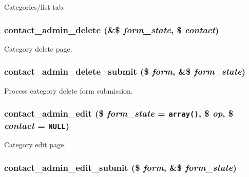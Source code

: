 Categories/list tab. \hypertarget{contact_8admin_8inc_c78c28a9e0308300c1e89223ea6984d9}{
\subsubsection[{contact\_\-admin\_\-delete}]{\setlength{\rightskip}{0pt plus 5cm}contact\_\-admin\_\-delete (\&\$ {\em form\_\-state}, \/  \$ {\em contact})}}
\label{contact_8admin_8inc_c78c28a9e0308300c1e89223ea6984d9}


Category delete page. \hypertarget{contact_8admin_8inc_9fb0a8959ab954f593d7d08ff3c748e9}{
\subsubsection[{contact\_\-admin\_\-delete\_\-submit}]{\setlength{\rightskip}{0pt plus 5cm}contact\_\-admin\_\-delete\_\-submit (\$ {\em form}, \/  \&\$ {\em form\_\-state})}}
\label{contact_8admin_8inc_9fb0a8959ab954f593d7d08ff3c748e9}


Process category delete form submission. \hypertarget{contact_8admin_8inc_5ca6a5a6a6782c03fa2c8355595e5325}{
\subsubsection[{contact\_\-admin\_\-edit}]{\setlength{\rightskip}{0pt plus 5cm}contact\_\-admin\_\-edit (\$ {\em form\_\-state} = {\tt array()}, \/  \$ {\em op}, \/  \$ {\em contact} = {\tt NULL})}}
\label{contact_8admin_8inc_5ca6a5a6a6782c03fa2c8355595e5325}


Category edit page. \hypertarget{contact_8admin_8inc_8eef340a2f198b887ea177273ab566a5}{
\subsubsection[{contact\_\-admin\_\-edit\_\-submit}]{\setlength{\rightskip}{0pt plus 5cm}contact\_\-admin\_\-edit\_\-submit (\$ {\em form}, \/  \&\$ {\em form\_\-state})}}
\label{contact_8admin_8inc_8eef340a2f198b887ea177273ab566a5}


